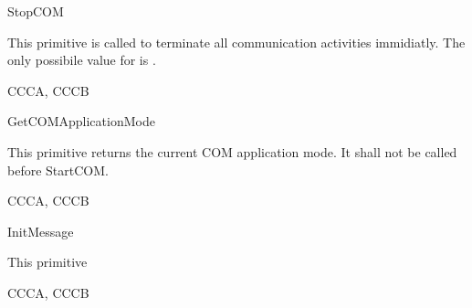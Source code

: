 \begin{function}{StopCOM}
  \begin{fundescription}
    This primitive is called to terminate all communication activities immidiatly. The only possibile value for  is . 
  \end{fundescription}
  \begin{funparameters}
  \end{funparameters}
  \begin{funreturn}
  \end{funreturn}
  \begin{funconformance}
    CCCA, CCCB
  \end{funconformance}
\end{function}


\begin{function}{GetCOMApplicationMode}
  \begin{fundescription}
    This primitive returns the current COM application mode. It shall not be called before StartCOM.
  \end{fundescription}
  \begin{funparameters}
  \end{funparameters}
  \begin{funreturn}
  \end{funreturn}
  \begin{funconformance}
    CCCA, CCCB
  \end{funconformance}
\end{function}

\begin{function}{InitMessage}
  \begin{fundescription}
    This primitive 
  \end{fundescription}
  \begin{funparameters}
  \end{funparameters}
  \begin{funreturn}
  \end{funreturn}
  \begin{funconformance}
    CCCA, CCCB
  \end{funconformance}
\end{function}

